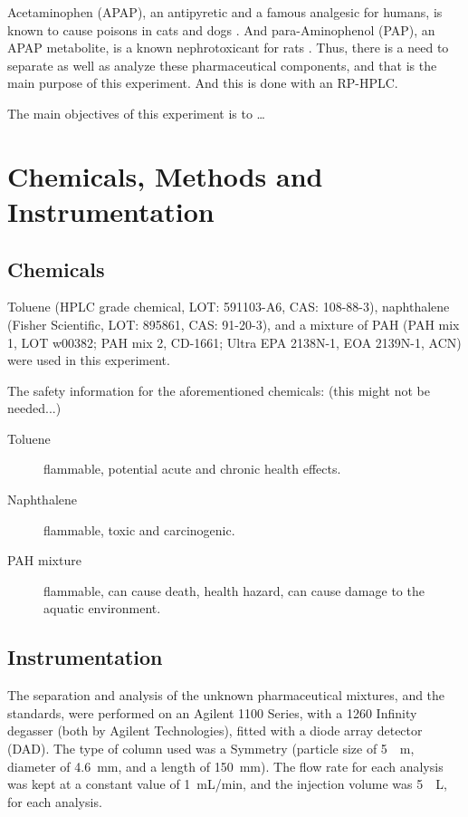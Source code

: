 \documentclass[a4paper, 12pt]{article}
\begin{document}
Acetaminophen (APAP), an antipyretic and a famous analgesic for humans, is known to cause poisons in cats and dogs \cite{dogs-cats}. And para-Aminophenol (PAP), an APAP metabolite, is a known nephrotoxicant for rats \cite{rats}. Thus, there is a need to separate as well as analyze these pharmaceutical components, and that is the main purpose of this experiment. And this is done with an RP-HPLC.

The main objectives of this experiment is to \ldots{}


\section{Chemicals, Methods and Instrumentation}

\subsection{Chemicals}
Toluene (HPLC grade chemical, LOT: 591103-A6, CAS: 108-88-3), naphthalene (Fisher Scientific, LOT: 895861, CAS: 91-20-3), and a mixture of PAH (PAH mix 1, LOT w00382; PAH mix 2, CD-1661; Ultra EPA 2138N-1, EOA 2139N-1, ACN) were used in this experiment.


The safety information for the aforementioned chemicals: (this might not be needed...)
\begin{description}
	\item[Toluene] flammable, potential acute and chronic health effects.
	\item[Naphthalene] flammable, toxic and carcinogenic.
	\item[PAH mixture] flammable, can cause death, health hazard, can cause damage to the aquatic environment.
\end{description}

\subsection{Instrumentation}
The separation and analysis of the unknown pharmaceutical mixtures, and the standards, were performed on an Agilent 1100 Series, with a 1260 Infinity degasser (both by Agilent Technologies), fitted with a diode array detector (DAD). The type of column used was a Symmetry\textregistered{}  (particle size of \SI{5}{\mu{}m}, diameter of \SI{4.6}{mm}, and a length of \SI{150}{mm}). The flow rate for each analysis was kept at a constant value of \SI{1}{mL/min}, and the injection volume was \SI{5}{\mu{}L}, for each analysis.
\end{document}
